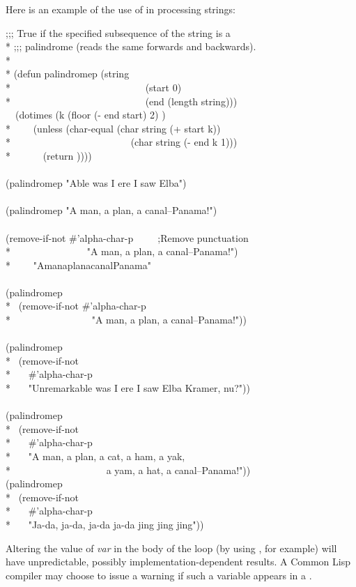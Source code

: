 \begin{defmac}
Here is an example of the use of  in processing strings:
\begin{lisp}
;;; True if the specified subsequence of the string is a \\*
;;; palindrome (reads the same forwards and backwards). \\*
\\*
(defun palindromep (string  \\*
~~~~~~~~~~~~~~~~~~~~~~~~~~~(start 0) \\*
~~~~~~~~~~~~~~~~~~~~~~~~~~~(end (length string))) \\
~~(dotimes (k (floor (- end start) 2) {\true}) \\*
~~~~(unless (char-equal (char string (+ start k)) \\*
~~~~~~~~~~~~~~~~~~~~~~~~(char string (- end k 1))) \\*
~~~~~~(return {\false})))) \\
\\
(palindromep "Able was I ere I saw Elba") \EV\ {\true} \\
 \\
(palindromep "A man, a plan, a canal--Panama!") \EV\ {\false} \\
 \\
(remove-if-not \#'alpha-char-p~~~~~;\textrm{Remove punctuation} \\*
~~~~~~~~~~~~~~~"A man, a plan, a canal--Panama!") \\*
~~~\EV\ "AmanaplanacanalPanama" \\
 \\
(palindromep \\*
~(remove-if-not \#'alpha-char-p \\*
~~~~~~~~~~~~~~~~"A man, a plan, a canal--Panama!")) \EV\ {\true} \\
 \\
(palindromep \\*
~(remove-if-not \\*
~~~\#'alpha-char-p \\*
~~~"Unremarkable was I ere I saw Elba Kramer, nu?")) \EV\ {\true} \\
 \\
(palindromep \\*
~(remove-if-not \\*
~~~\#'alpha-char-p \\*
~~~"A man, a plan, a cat, a ham, a yak, \\*
~~~~~~~~~~~~~~~~~~~a yam, a hat, a canal--Panama!")) \EV\ {\true}
\\
(palindromep \\*
~(remove-if-not \\*
~~~\#'alpha-char-p \\*
~~~"Ja-da, ja-da, ja-da ja-da jing jing jing")) \EV\ {\false}
\end{lisp}

Altering the value of \emph{var} in the body of the loop (by using ,
for example) will have unpredictable, possibly implementation-dependent
results.  A Common Lisp compiler may choose to issue a warning if such a variable
appears in a .
\end{defmac}

